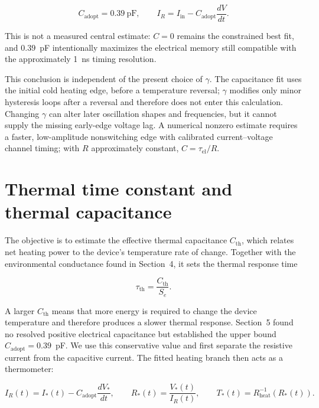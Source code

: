 \documentclass[11pt]{article}
\begin{document}
\begin{equation}
C_{\mathrm{adopt}}=0.39~\mathrm{pF},
\qquad
I_R=I_{\mathrm{in}}-C_{\mathrm{adopt}}\frac{dV}{dt}.
\end{equation}

This is not a measured central estimate: $C=0$ remains the constrained best fit,
and $0.39$~pF intentionally maximizes the electrical memory still compatible with
the approximately 1~ns timing resolution.

This conclusion is independent of the present choice of $\gamma$. The capacitance fit uses the initial cold heating edge, before a temperature reversal; $\gamma$ modifies only minor hysteresis loops after a reversal and therefore does not enter this calculation. Changing $\gamma$ can alter later oscillation shapes and frequencies, but it cannot supply the missing early-edge voltage lag. A numerical nonzero estimate requires a faster, low-amplitude nonswitching edge with calibrated current--voltage channel timing; with $R$ approximately constant, $C=\tau_{\mathrm{el}}/R$.

\section{Thermal time constant and thermal capacitance}
\label{sec:thermal_capacitance}

The objective is to estimate the effective thermal capacitance $C_{\mathrm{th}}$,
which relates net heating power to the device's temperature rate of change. Together
with the environmental conductance found in Section~4, it sets the thermal response
time

\begin{equation}
\tau_{\mathrm{th}}=\frac{C_{\mathrm{th}}}{S_e}.
\end{equation}

A larger $C_{\mathrm{th}}$ means that more energy is required to change the device
temperature and therefore produces a slower thermal response. Section~5 found no
resolved positive electrical capacitance but established the upper bound
$C_{\mathrm{adopt}}=0.39$~pF. We use this conservative value and first separate the
resistive current from the capacitive current. The fitted heating branch then acts
as a thermometer:

\begin{equation}
I_R(t)=I_*(t)-C_{\mathrm{adopt}}\frac{dV_*}{dt},
\qquad
R_*(t)=\frac{V_*(t)}{I_R(t)},
\qquad
T_*(t)=R_{\mathrm{heat}}^{-1}\!\left(R_*(t)\right).
\end{equation}
\end{document}
